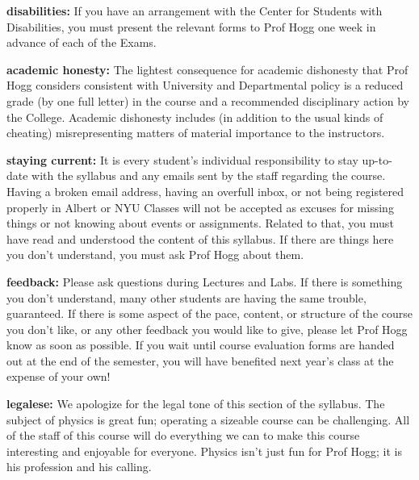 \documentclass[12pt]{article}
\renewcommand{\paragraph}[1]{\par\smallskip\noindent\textbf{#1}}
\begin{document}
\paragraph{disabilities:}
If you have an arrangement with the Center for Students with
Disabilities, you must present the relevant forms to Prof Hogg one
week in advance of each of the Exams.

\paragraph{academic honesty:}
The lightest consequence for academic dishonesty that Prof Hogg
considers consistent with University and Departmental policy is a
reduced grade (by one full letter) in the course and a recommended
disciplinary action by the College. Academic dishonesty includes (in
addition to the usual kinds of cheating) misrepresenting matters of
material importance to the instructors.

\paragraph{staying current:}
It is every student's individual responsibility to stay up-to-date
with the syllabus and any emails sent by the staff regarding the
course. Having a broken email address, having an overfull inbox, or
not being registered properly in Albert or NYU Classes will not be
accepted as excuses for missing things or not knowing about events or
assignments.
Related to that, 
you must have read and understood the content of this syllabus. If
there are things here you don't understand, you must ask Prof Hogg
about them.

\paragraph{feedback:}
Please ask questions during Lectures and Labs. If there is
something you don't understand, many other students are having the
same trouble, guaranteed. If there is some aspect of the pace,
content, or structure of the course you don't like, or any other
feedback you would like to give, please let Prof Hogg know as soon as
possible. If you wait until course evaluation forms are handed out at
the end of the semester, you will have benefited next year's class at
the expense of your own!

\paragraph{legalese:}
We apologize for the legal tone of this section of the syllabus. The
subject of physics is great fun; operating a sizeable course can be
challenging. All of the staff of this course will do everything we can
to make this course interesting and enjoyable for everyone. Physics
isn't just fun for Prof Hogg; it is his profession and his calling.
\end{document}
